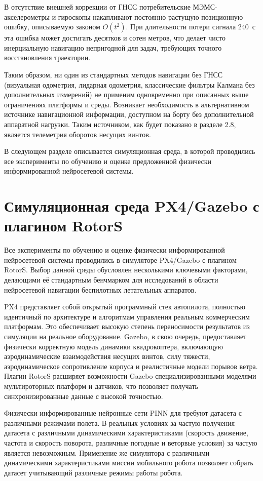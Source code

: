 В отсутствие внешней коррекции от ГНСС потребительские МЭМС-акселерометры и гироскопы накапливают постоянно растущую позиционную ошибку, описываемую законом \(O(t^2)\). При длительности потери сигнала 240~с эта ошибка может достигать десятков и сотен метров, что делает чисто инерциальную навигацию непригодной для задач, требующих точного восстановления траектории.

Таким образом, ни один из стандартных методов навигации без ГНСС (визуальная одометрия, лидарная одометрия, классические фильтры Калмана без дополнительных измерений) не применим одновременно при описанных выше ограничениях платформы и среды. Возникает необходимость в альтернативном источнике навигационной информации, доступном на борту без дополнительной аппаратной нагрузки. Таким источником, как будет показано в разделе 2.8, является телеметрия оборотов несущих винтов.

В следующем разделе описывается симуляционная среда, в которой проводились все эксперименты по обучению и оценке предложенной физически информированной нейросетевой системы.


\section{Симуляционная среда PX4/Gazebo с плагином RotorS}
\label{sec:simulator}

Все эксперименты по обучению и оценке физически информированной нейросетевой системы проводились в симуляторе PX4/Gazebo с плагином RotorS. Выбор данной среды обусловлен несколькими ключевыми факторами, делающими её стандартным бенчмарком для исследований в области нейросетевой навигации беспилотных летательных аппаратов.

PX4 представляет собой открытый программный стек автопилота, полностью идентичный по архитектуре и алгоритмам управления реальным коммерческим платформам. Это обеспечивает высокую степень переносимости результатов из симуляции на реальное оборудование. Gazebo, в свою очередь, предоставляет физически корректную модель динамики квадрокоптера, включающую аэродинамические взаимодействия несущих винтов, силу тяжести, аэродинамическое сопротивление корпуса и реалистичные модели порывов ветра. Плагин RotorS расширяет возможности Gazebo специализированными моделями мультироторных платформ и датчиков, что позволяет получать синхронизированные данные с высокой точностью.

Физически информированные нейронные сети PINN для требуют датасета с различными режимами полета. В реальных условиях за частую получения датасета с различными динамическими характеристиками (скорость движение, частота и скорость поворота, различные погодные и веторвые условия) за частую является невозможным. Применение же симулятора с различными динамическими характеристиками миссии мобильного робота позволяет собрать датасет учитывающий различные режимы работы робота.  

